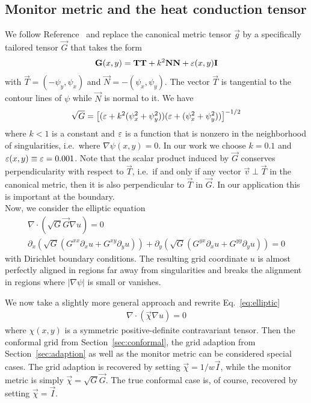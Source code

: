 \subsection{Monitor metric and the heat conduction tensor} \label{sec:metric}
We follow Reference~\cite{Liseikin, Glasser2006, Vaseva2009} and replace the canonical metric tensor $\vec g$ by
a specifically tailored tensor $\vec G$ that takes the form
\begin{align}
{\mathbf{G}}(x,y) = {\mathbf{T}} {\mathbf{T}} + k^2{\mathbf{N}} {\mathbf{N}} + \varepsilon(x,y){\mathbf{I}}
\label{eq:metric}
\end{align}
with $\vec T = (-\psi_y, \psi_x)$ and $\vec N = -(\psi_x, \psi_y)$. 
The vector $\vec T$ is tangential to the contour lines of $\psi$ while $\vec N$ is 
normal to it. 
We have 
\begin{align}
  \sqrt{G} = \left[(\varepsilon+k^2(\psi_x^2+\psi_y^2))(\varepsilon+(\psi_x^2+\psi_y^2))\right]^{-1/2}
  \label{}
\end{align}
where $k<1$ is a constant and $\varepsilon$ is a function that is nonzero in the neighborhood
of singularities, i.e.~where $\nabla \psi(x,y)=0$.
In our work we choose $k=0.1$ and $\varepsilon(x,y)\equiv\varepsilon =0.001$.
Note that the scalar product induced by $\vec G$ conserves perpendicularity 
with respect to $\vec T$, i.e.~if
and only if
 any vector $\vec v \perp \vec T$ in the canonical metric, then it is also perpendicular to $\vec T$ in $\vec G$.
In our application this is important at the boundary.\\
%
Now, we consider the elliptic equation
\begin{align}
  \nabla\cdot(\sqrt{G}\vec G \nabla u) = 0\nonumber\\
  \partial_x(\sqrt{G} (G^{xx}\partial_x u + G^{xy}\partial_y u )) + \partial_y(\sqrt{G}(G^{yx}\partial_x u + G^{yy}\partial_y u )) = 0
  \label{eq:elliptic}
\end{align}
with Dirichlet boundary conditions. %
The resulting grid coordinate $u$ is almost perfectly aligned in regions
far away from singularities and breaks the alignment in regions where $|\nabla\psi|$ is small or vanishes.

We now take a slightly more general approach and rewrite Eq.~\eqref{eq:elliptic}
\begin{align}
  \nabla\cdot(\vec \chi \nabla u) = 0
  \label{eq:elliptic_mod}
\end{align}
where $\chi(x,y)$ is a symmetric positive-definite contravariant tensor. 
Then the conformal grid from Section~\ref{sec:conformal}, the grid adaption from Section~\ref{sec:adaption} as 
well as the monitor metric can be considered special cases. 
The grid adaption is recovered by setting $\vec \chi = 1/w\vec I$,
while the monitor metric is simply $\vec \chi = \sqrt{G}\vec G$. 
The true conformal case is, of course, recovered by setting $\vec \chi = \vec I$. 

